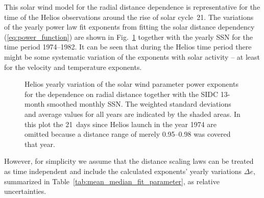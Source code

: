 This solar wind model for the radial distance dependence is representative for the time of the Helios observations around the rise of solar cycle~21. The variations of the yearly power law fit exponents from fitting the solar distance dependency (\ref{eq:power_function}) are shown in Fig.~\ref{fig:yearly_gradients_c} together with the yearly SSN for the time period \numrange{1974}{1982}. It can be seen that during the Helios time period there might be some systematic  variation of the exponents with solar activity -- at least for the velocity and temperature exponents.
\begin{figure}
	\caption{Helios yearly variation of the solar wind parameter power exponents for the dependence on radial distance together with the SIDC 13-month smoothed monthly SSN. The weighted standard deviations and average values for all years are indicated by the shaded areas. In this plot the 21~days since Helios launch in the year 1974 are omitted because a distance range of merely \SIrange{0.95}{0.98}{\au} was covered that year.}
	\label{fig:yearly_gradients_c}
\end{figure}
However, for simplicity we assume that the distance scaling laws can be treated as time independent and include the calculated exponents’ yearly variations $\Delta e$, summarized in Table~\ref{tab:mean_median_fit_parameter}, as relative uncertainties.


